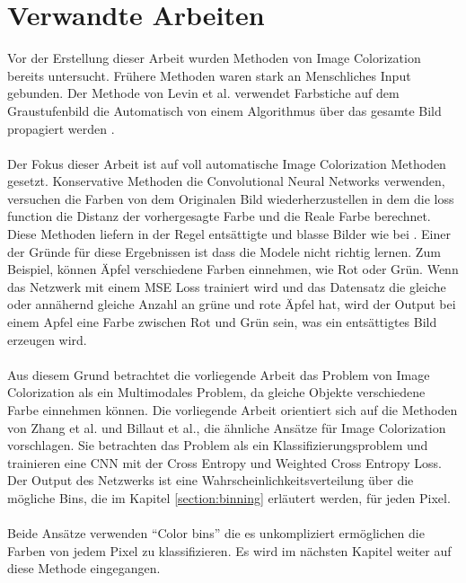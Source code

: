 \section{Verwandte Arbeiten}\label{subsection:verwandte-arbeiten}
Vor der Erstellung dieser Arbeit wurden Methoden von Image Colorization bereits untersucht. Frühere Methoden waren stark an Menschliches Input
gebunden. Der Methode von Levin et al. verwendet Farbstiche auf dem Graustufenbild die Automatisch von einem Algorithmus über das gesamte 
Bild propagiert werden \cite{10.1145/1015706.1015780}.
\\
\\
Der Fokus dieser Arbeit ist auf voll automatische Image Colorization Methoden gesetzt. Konservative Methoden die Convolutional Neural Networks 
verwenden, versuchen die Farben von dem Originalen Bild wiederherzustellen in dem die \gls{loss function} die Distanz der vorhergesagte 
Farbe und die Reale Farbe berechnet. Diese Methoden liefern in der Regel entsättigte und blasse Bilder wie bei \cite{zbulak2019image}. 
Einer der Gründe für diese Ergebnissen ist dass die Modele nicht richtig lernen. Zum Beispiel, können Äpfel verschiedene Farben einnehmen, 
wie Rot oder Grün. Wenn das Netzwerk mit einem MSE Loss trainiert wird und das Datensatz die gleiche oder annähernd gleiche Anzahl an
grüne und rote Äpfel hat, wird der Output bei einem Apfel eine Farbe zwischen Rot und Grün sein, was ein entsättigtes Bild erzeugen wird.
\\
\\
Aus diesem Grund betrachtet die vorliegende Arbeit das Problem von Image Colorization als ein Multimodales Problem, 
da gleiche Objekte verschiedene Farbe einnehmen können.
Die vorliegende Arbeit orientiert sich auf die Methoden von Zhang et al. und Billaut et al., die ähnliche Ansätze für Image Colorization vorschlagen.
Sie betrachten das Problem als ein Klassifizierungsproblem und trainieren eine CNN mit der Cross Entropy und Weighted Cross Entropy Loss. 
Der Output des Netzwerks ist eine Wahrscheinlichkeitsverteilung über die mögliche Bins, die im Kapitel \ref{section:binning} erläutert werden, 
für jeden Pixel.
\\
\\
Beide Ansätze verwenden ``Color \gls{bin}s'' die es unkompliziert ermöglichen die Farben von jedem Pixel zu klassifizieren. 
Es wird im nächsten Kapitel weiter auf diese Methode eingegangen.
